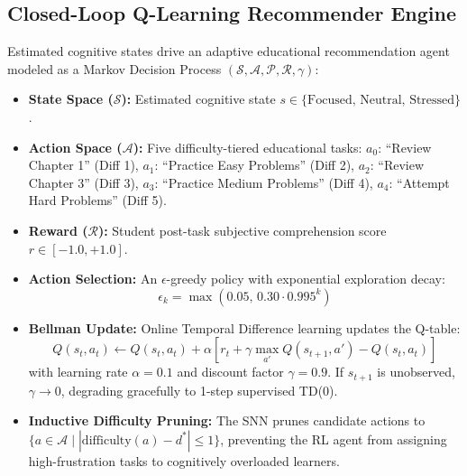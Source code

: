 \documentclass[conference]{IEEEtran}
\begin{document}
\subsection{Closed-Loop Q-Learning Recommender Engine}
Estimated cognitive states drive an adaptive educational recommendation agent modeled as a Markov Decision Process $(\mathcal{S}, \mathcal{A}, \mathcal{P}, \mathcal{R}, \gamma)$:
\begin{itemize}
    \item \textbf{State Space ($\mathcal{S}$):} Estimated cognitive state $s \in \{\text{Focused, Neutral, Stressed}\}$.
    \item \textbf{Action Space ($\mathcal{A}$):} Five difficulty-tiered educational tasks:
    $a_0$: ``Review Chapter 1'' (Diff 1), $a_1$: ``Practice Easy Problems'' (Diff 2), $a_2$: ``Review Chapter 3'' (Diff 3), $a_3$: ``Practice Medium Problems'' (Diff 4), $a_4$: ``Attempt Hard Problems'' (Diff 5).
    \item \textbf{Reward ($\mathcal{R}$):} Student post-task subjective comprehension score $r \in [-1.0, +1.0]$.
    \item \textbf{Action Selection:} An $\epsilon$-greedy policy with exponential exploration decay:
    \begin{equation}
    \epsilon_k = \max\left(0.05, \, 0.30 \cdot 0.995^k\right)
    \end{equation}
    \item \textbf{Bellman Update:} Online Temporal Difference learning updates the Q-table:
    \begin{equation}
    Q(s_t, a_t) \leftarrow Q(s_t, a_t) + \alpha \left[ r_t + \gamma \max_{a'} Q(s_{t+1}, a') - Q(s_t, a_t) \right]
    \end{equation}
    with learning rate $\alpha = 0.1$ and discount factor $\gamma = 0.9$. If $s_{t+1}$ is unobserved, $\gamma \to 0$, degrading gracefully to 1-step supervised TD(0).
    \item \textbf{Inductive Difficulty Pruning:} The SNN prunes candidate actions to $\{a \in \mathcal{A} \mid |\text{difficulty}(a) - d^*| \le 1\}$, preventing the RL agent from assigning high-frustration tasks to cognitively overloaded learners.
\end{itemize}
\end{document}
